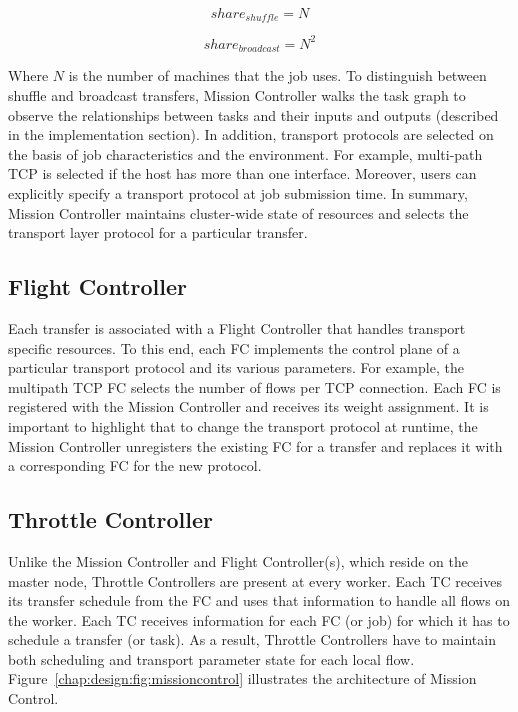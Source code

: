 \documentclass[a4paper,12pt,twoside,openright]{report}
\begin{document}
\begin{equation}
  share_{shuffle} = N
\end{equation}

\begin{equation}
  share_{broadcast} = N^2
\end{equation}

Where $N$ is the number of machines that the job uses. To distinguish between
shuffle and broadcast transfers, Mission Controller walks the task graph to
observe the relationships between tasks and their inputs and outputs (described
in the implementation section). In addition, transport protocols are selected on
the basis of job characteristics and the environment. For example, multi-path
TCP is selected if the host has more than one interface. Moreover, users can
explicitly specify a transport protocol at job submission time. In summary,
Mission Controller maintains cluster-wide state of resources and selects the
transport layer protocol for a particular transfer.

\subsection{Flight Controller}
Each transfer is associated with a Flight Controller that handles transport
specific resources. To this end, each FC implements the control plane of a
particular transport protocol and its various parameters.
For example, the multipath TCP FC selects the number of flows per TCP
connection. Each FC is registered with the Mission Controller and receives its
weight assignment. It is important to highlight that to change the transport
protocol at runtime, the Mission Controller unregisters the existing FC for a
transfer and replaces it with a corresponding FC for the new protocol.

\subsection{Throttle Controller}
Unlike the Mission Controller and Flight Controller(s), which reside on the
master node, Throttle Controllers are present at every worker. Each TC receives
its transfer schedule from the FC and uses that information to handle all flows
on the worker. Each TC receives information for each FC (or job) for which it
has to schedule a transfer (or task). As a result, Throttle Controllers have to
maintain both scheduling and transport parameter state for each local flow.
Figure~\ref{chap:design:fig:missioncontrol} illustrates the architecture of
Mission Control.
\end{document}
